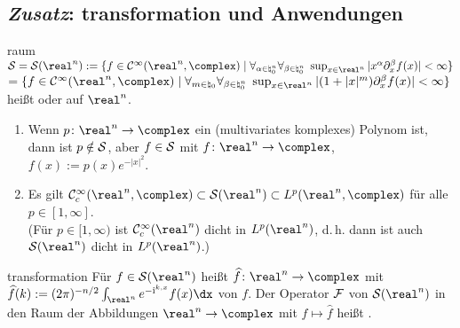 \pagebreak

\subsection{%
    \emph{Zusatz}: transformation und Anwendungen%
}

\begin{Def}{raum}
    $\S = \S(\real^n) :=
    \{f \in \C^\infty(\real^n, \complex) \;|\;
    \forall_{\alpha\in\natural_0^n} \forall_{\beta\in\natural_0^n}\;
    \sup_{x \in \real^n} |x^\alpha \partial_x^\beta f(x)| < \infty\}$\\
    $= \{f \in \C^\infty(\real^n, \complex) \;|\;
    \forall_{m \in \natural_0} \forall_{\beta \in \natural_0^n}\;
    \sup_{x \in \real^n} |(1 + |x|^m) \partial_x^\beta f(x)| < \infty\}$\\
    heißt  oder
     auf $\real^n$.
\end{Def}

\begin{Bem}
    \begin{enumerate}
        \item
        Wenn $p\colon \real^n \rightarrow \complex$ ein
        (multivariates komplexes) Polynom ist, dann ist $p \notin \S$,
        aber $f \in \S$ mit $f\colon \real^n \rightarrow \complex$, $f(x) := p(x) e^{-|x|^2}$.
        
        \item
        Es gilt $\C^\infty_c(\real^n, \complex) \subset \S(\real^n) \subset L^p(\real^n, \complex)$
        für alle $p \in [1, \infty]$.\\
        (Für $p \in [1, \infty)$ ist $\C^\infty_c(\real^n)$ dicht in $L^p(\real^n)$,
        d.\,h. dann ist auch $\S(\real^n)$ dicht in $L^p(\real^n)$.)
    \end{enumerate}
\end{Bem}

\linie

\begin{Def}{transformation}
    Für $f \in \S(\real^n)$ heißt $\widehat{f}\colon \real^n \rightarrow \complex$ mit\\
    $\widehat{f}(k) := (2\pi)^{-n/2} \int_{\real^n} e^{-\iu\sp{k,x}} f(x)\dx$
     von $f$.
    Der Operator $\F$ von $\S(\real^n)$ in den Raum der Abbildungen $\real^n \rightarrow \complex$
    mit $f \mapsto \widehat{f}$ heißt .
\end{Def}

